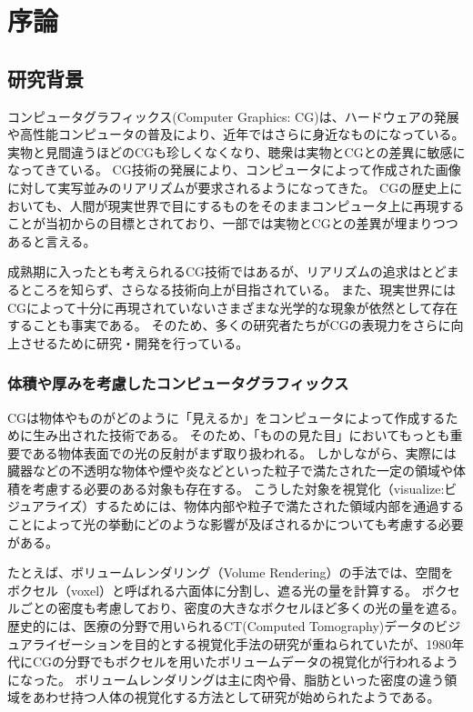 \chapter{序論}
\label{CBegin}

\section{研究背景}
\label{SBackground}

コンピュータグラフィックス(Computer Graphics: CG)は、ハードウェアの発展や高性能コンピュータの普及により、近年ではさらに身近なものになっている。
実物と見間違うほどのCGも珍しくなくなり、聴衆は実物とCGとの差異に敏感になってきている。
CG技術の発展により、コンピュータによって作成された画像に対して実写並みのリアリズムが要求されるようになってきた。
CGの歴史上においても、人間が現実世界で目にするものをそのままコンピュータ上に再現することが当初からの目標とされており、一部では実物とCGとの差異が埋まりつつあると言える。

成熟期に入ったとも考えられるCG技術ではあるが、リアリズムの追求はとどまるところを知らず、さらなる技術向上が目指されている。
また、現実世界にはCGによって十分に再現されていないさまざまな光学的な現象が依然として存在することも事実である。
そのため、多くの研究者たちがCGの表現力をさらに向上させるために研究・開発を行っている。


\subsection{体積や厚みを考慮したコンピュータグラフィックス}
\label{SSVolumerendering}

CGは物体やものがどのように「見えるか」をコンピュータによって作成するために生み出された技術である。
そのため、「ものの見た目」においてもっとも重要である物体表面での光の反射がまず取り扱われる。
しかしながら、実際には臓器などの不透明な物体や煙や炎などといった粒子で満たされた一定の領域や体積を考慮する必要のある対象も存在する。
こうした対象を視覚化（visualize:ビジュアライズ）するためには、物体内部や粒子で満たされた領域内部を通過することによって光の挙動にどのような影響が及ぼされるかについても考慮する必要がある。

たとえば、ボリュームレンダリング（Volume Rendering）の手法では、空間をボクセル（voxel）と呼ばれる六面体に分割し、遮る光の量を計算する。
ボクセルごとの密度も考慮しており、密度の大きなボクセルほど多くの光の量を遮る。
歴史的には、医療の分野で用いられるCT(Computed Tomography)データのビジュアライゼーションを目的とする視覚化手法の研究が重ねられていたが、1980年代にCGの分野でもボクセルを用いたボリュームデータの視覚化が行われるようになった。\cite{}
ボリュームレンダリングは主に肉や骨、脂肪といった密度の違う領域をあわせ持つ人体の視覚化する方法として研究が始められたようである。

